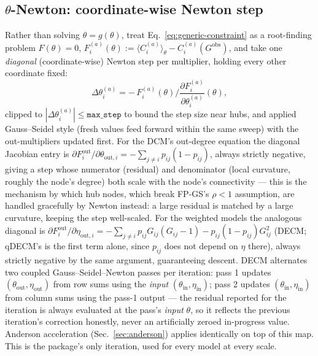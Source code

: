\documentclass[10pt]{article}
\begin{document}
\subsection{$\theta$-Newton: coordinate-wise Newton step}
\label{sec:newton}

Rather than solving $\theta=g(\theta)$, treat
Eq.~\ref{eq:generic-constraint} as a root-finding problem
$F(\theta)=0$, $F^{(a)}_i(\theta) := \langle C^{(a)}_i\rangle_\theta -
C^{(a)}_i(G^{\mathrm{obs}})$, and take one \emph{diagonal} (coordinate-wise)
Newton step per multiplier, holding every other coordinate fixed:
\begin{equation}
\label{eq:newton-generic}
\Delta\theta^{(a)}_i = -\, F^{(a)}_i(\theta) \Big/ \frac{\partial F^{(a)}_i}{\partial \theta^{(a)}_i}(\theta),
\end{equation}
clipped to $|\Delta\theta^{(a)}_i|\le \texttt{max\_step}$ to bound the step
size near hubs, and applied Gauss--Seidel style (fresh values feed
forward within the same sweep) with the out-multipliers updated first. For the
DCM's out-degree equation the diagonal Jacobian entry is
$\partial F^{\mathrm{out}}_i/\partial\theta_{\mathrm{out},i} =
-\sum_{j\ne i} p_{ij}(1-p_{ij})$, always strictly negative, giving a step
whose numerator (residual) and denominator (local curvature, roughly the
node's degree) both scale with the node's connectivity --- this is the
mechanism by which hub nodes, which break FP-GS's $\rho<1$ assumption, are
handled gracefully by Newton instead: a large residual is matched by a
large curvature, keeping the step well-scaled. For the weighted models the
analogous diagonal is
$\partial F^{\mathrm{out}}_i/\partial\eta_{\mathrm{out},i} =
-\sum_{j\ne i} p_{ij}G_{ij}(G_{ij}-1) - p_{ij}(1-p_{ij})G_{ij}^2$
(DECM; qDECM's is the first term alone, since $p_{ij}$ does not depend on
$\eta$ there), always strictly negative by the same argument, guaranteeing
descent. DECM alternates two coupled Gauss--Seidel--Newton passes per
iteration: pass 1 updates $(\theta_{\mathrm{out}},\eta_{\mathrm{out}})$
from row sums using the \emph{input} $(\theta_{\mathrm{in}},\eta_{\mathrm{in}})$;
pass 2 updates $(\theta_{\mathrm{in}},\eta_{\mathrm{in}})$ from column sums
using the pass-1 output --- the residual reported for the iteration is
always evaluated at the pass's \emph{input} $\theta$, so it reflects the
previous iteration's correction honestly, never an artificially zeroed
in-progress value. Anderson acceleration (Sec.~\ref{sec:anderson}) applies
identically on top of this map. This is the package's only iteration, used for every model at every scale.
\end{document}

